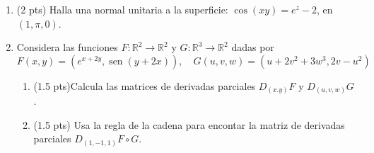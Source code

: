 \documentclass[12pt]{article}
\newcommand{\sen}{\operatorname{sen}}
\begin{document}
\bigskip

            
\bigskip
\bigskip
\bigskip


\begin{enumerate}

  
\item(2 pts) Halla una normal unitaria a la superficie: $\cos(xy)=e^z-2$, en $(1,\pi,0)$.
 


  \vspace{3cm}

\item Considera las funciones $F:\mathbb{R}^2 \to \mathbb{R}^2$ y $G:\mathbb{R}^3 \to \mathbb{R}^2$
  dadas por
  $$
  F(x,y)=(e^{x+2y}, \sen(y+2x)), \quad G(u,v,w)=(u+2v^2+3w^3, 2v-u^2)
  $$

  \begin{enumerate}
  \item (1.5 pts)Calcula las matrices de derivadas parciales $D_{(x.y)}F$ y $D_{(u,v,w)}G$.
  \item (1.5 pts)  Usa la regla de la cadena para encontar la matriz de derivadas
    parciales  $D_{(1,-1,1)}F\circ G$.
  \end{enumerate}
  
\end{enumerate}


  
\end{document}
